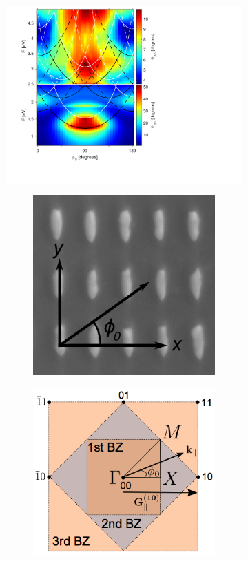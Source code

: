 \begin{figure}[h]
    \begin{subfigure}{0.5\textwidth}
        \centering
        \includegraphics[width=\linewidth, trim=1.2cm  1.8cm 6.5cm 0.3cm, clip]{figures/ch4/S5B/contour/S5B_Psipp.pdf}
        \caption{}
    \end{subfigure}
    \begin{subfigure}{0.5\textwidth}
        \centering
        \begin{subfigure}{\textwidth}
            \centering
            \includegraphics[width=0.41\linewidth]{figures/Ch3/s5b/S5B_schematic.png}
        \end{subfigure}
        
        \begin{subfigure}{\textwidth}
            \centering
            \includegraphics[width=0.5\linewidth]{figures/Ch2/ReciprocalLattice.png}
        \end{subfigure}
    \end{subfigure}
    

\end{figure}
